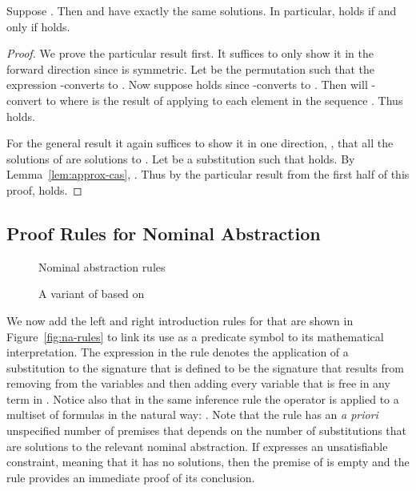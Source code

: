 \begin{lemma}
\label{lem:na-approx}
Suppose . Then  and
 have exactly the same solutions. In particular,
 holds if and only if  holds.
\end{lemma}
\begin{proof}
We prove the particular result first. It suffices to only show it in
the forward direction since  is symmetric. Let  be the
permutation such that the expression  -converts to
. Now suppose  holds since 
-converts to . Then  will
-convert to  where  is
the result of applying  to each element in the sequence .
Thus  holds.

For the general result it again suffices to show it in one direction,
\ie, that all the solutions of  are solutions to . Let  be a substitution such that  holds. By Lemma~\ref{lem:approx-cas}, . Thus by the
particular result from the first half of this proof,  holds.
\end{proof}

\subsection{Proof Rules for Nominal Abstraction}

\begin{figure}[t]
\small

\caption{Nominal abstraction rules}
\label{fig:na-rules}
\bigskip

\caption{A variant of  based on \CSNAS}
\label{fig:csnas}
\end{figure}

We now add the left and right introduction rules for  that are
shown in Figure~\ref{fig:na-rules} to link its use as a predicate
symbol to its mathematical interpretation. The expression  in the  rule denotes the application of a
substitution  to the signature
 that is defined to be the signature that results from
removing from  the variables  and then
adding every variable that is free in any term in
. Notice also that in the same inference rule the
operator  is applied to a multiset of formulas in the
natural way: .
Note that the  rule has an {\it a priori} unspecified number
of premises that depends on the number of substitutions that are
solutions to the relevant nominal abstraction. If 
expresses an unsatisfiable constraint, meaning that it has no
solutions, then the premise of  is empty and the rule
provides an immediate proof of its conclusion.

